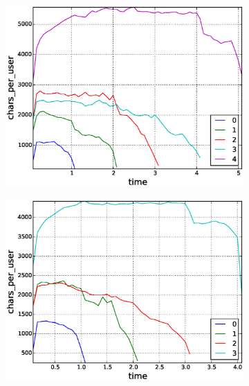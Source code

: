 \begin{figure}[!tb]
\begin{subfigure}{.3\textwidth}\includegraphics[scale=0.285]{./images/avr_comment_length_user_for_surviving_year_for_2010.eps}\caption{}\end{subfigure}
\begin{subfigure}{.3\textwidth}\includegraphics[scale=0.285]{./images/avr_comment_length_user_for_surviving_year_for_2011.eps}\caption{}\end{subfigure}

\end{figure}
